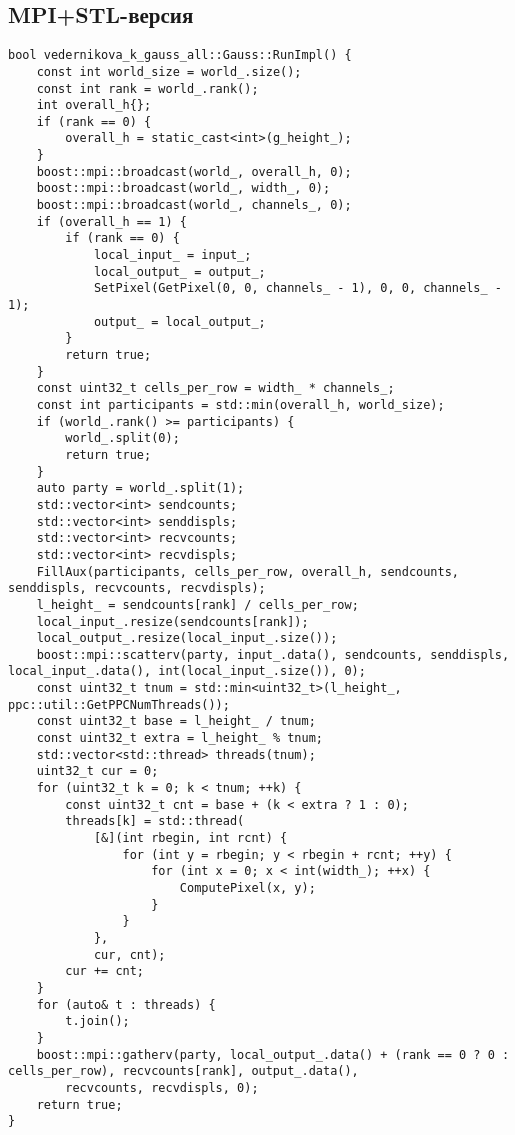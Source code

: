 \documentclass[a4paper,12pt]{article}
\begin{document}
\subsection*{MPI+STL-версия}
\begin{verbatim}
bool vedernikova_k_gauss_all::Gauss::RunImpl() {
    const int world_size = world_.size();
    const int rank = world_.rank();
    int overall_h{};
    if (rank == 0) {
        overall_h = static_cast<int>(g_height_);
    }
    boost::mpi::broadcast(world_, overall_h, 0);
    boost::mpi::broadcast(world_, width_, 0);
    boost::mpi::broadcast(world_, channels_, 0);
    if (overall_h == 1) {
        if (rank == 0) {
            local_input_ = input_;
            local_output_ = output_;
            SetPixel(GetPixel(0, 0, channels_ - 1), 0, 0, channels_ - 1);
            output_ = local_output_;
        }
        return true;
    }
    const uint32_t cells_per_row = width_ * channels_;
    const int participants = std::min(overall_h, world_size);
    if (world_.rank() >= participants) {
        world_.split(0);
        return true;
    }
    auto party = world_.split(1);
    std::vector<int> sendcounts;
    std::vector<int> senddispls;
    std::vector<int> recvcounts;
    std::vector<int> recvdispls;
    FillAux(participants, cells_per_row, overall_h, sendcounts, senddispls, recvcounts, recvdispls);
    l_height_ = sendcounts[rank] / cells_per_row;
    local_input_.resize(sendcounts[rank]);
    local_output_.resize(local_input_.size());
    boost::mpi::scatterv(party, input_.data(), sendcounts, senddispls, local_input_.data(), int(local_input_.size()), 0);
    const uint32_t tnum = std::min<uint32_t>(l_height_, ppc::util::GetPPCNumThreads());
    const uint32_t base = l_height_ / tnum;
    const uint32_t extra = l_height_ % tnum;
    std::vector<std::thread> threads(tnum);
    uint32_t cur = 0;
    for (uint32_t k = 0; k < tnum; ++k) {
        const uint32_t cnt = base + (k < extra ? 1 : 0);
        threads[k] = std::thread(
            [&](int rbegin, int rcnt) {
                for (int y = rbegin; y < rbegin + rcnt; ++y) {
                    for (int x = 0; x < int(width_); ++x) {
                        ComputePixel(x, y);
                    }
                }
            },
            cur, cnt);
        cur += cnt;
    }
    for (auto& t : threads) {
        t.join();
    }
    boost::mpi::gatherv(party, local_output_.data() + (rank == 0 ? 0 : cells_per_row), recvcounts[rank], output_.data(),
        recvcounts, recvdispls, 0);
    return true;
}
\end{verbatim}
\end{document}
